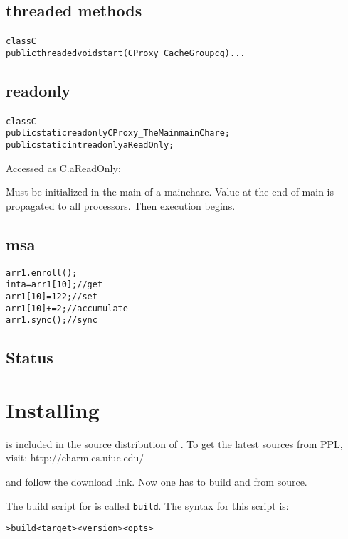 \documentclass[10pt]{article}
\begin{document}
\subsection{threaded methods}

\begin{alltt}
class C {
    public threaded void start(CProxy_CacheGroup cg) { ... }
}
\end{alltt}

\subsection{readonly}

\begin{alltt}
class C {
    public static readonly CProxy_TheMain mainChare;
    public static int readonly aReadOnly;
}
\end{alltt}

Accessed as C.aReadOnly;

Must be initialized in the main of a mainchare.  Value at the end of main is
propagated to all processors.  Then execution begins.

\subsection{msa}

\begin{alltt}
arr1.enroll();
int a = arr1[10]; // get
arr1[10] = 122; // set
arr1[10] += 2;  // accumulate
arr1.sync();    // sync
\end{alltt}

\subsection{\jade Status}

\appendix

\section{Installing \jade}

\jade is included in the source distribution of \charmpp{}. 
To get the latest sources from PPL, visit:
	http://charm.cs.uiuc.edu/

and follow the download link.
Now one has to build \charmpp{} and \jade from source.

The build script for \charmpp{} is called \texttt{build}. The syntax for this
script is:

\begin{alltt}
> build <target> <version> <opts>
\end{alltt}
\end{document}
